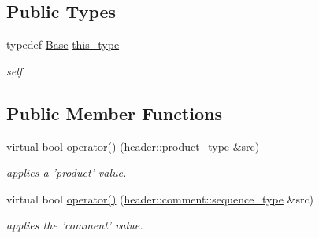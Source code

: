 \subsection*{Public Types}
\begin{DoxyCompactItemize}
\item 
\hypertarget{classhryky_1_1http_1_1header_1_1product__comment_1_1dispatcher_1_1_base_af6a63f75e57bd57e61476822945eb14e}{typedef \hyperlink{classhryky_1_1http_1_1header_1_1product__comment_1_1dispatcher_1_1_base}{Base} \hyperlink{classhryky_1_1http_1_1header_1_1product__comment_1_1dispatcher_1_1_base_af6a63f75e57bd57e61476822945eb14e}{this\-\_\-type}}\label{classhryky_1_1http_1_1header_1_1product__comment_1_1dispatcher_1_1_base_af6a63f75e57bd57e61476822945eb14e}

\begin{DoxyCompactList}\small\item\em self. \end{DoxyCompactList}\end{DoxyCompactItemize}
\subsection*{Public Member Functions}
\begin{DoxyCompactItemize}
\item 
\hypertarget{classhryky_1_1http_1_1header_1_1product__comment_1_1dispatcher_1_1_base_ab48ac4c4dc4bec82ba36d5d6df51f8ba}{virtual bool \hyperlink{classhryky_1_1http_1_1header_1_1product__comment_1_1dispatcher_1_1_base_ab48ac4c4dc4bec82ba36d5d6df51f8ba}{operator()} (\hyperlink{classhryky_1_1http_1_1header_1_1product_1_1_entity}{header\-::product\-\_\-type} \&src)}\label{classhryky_1_1http_1_1header_1_1product__comment_1_1dispatcher_1_1_base_ab48ac4c4dc4bec82ba36d5d6df51f8ba}

\begin{DoxyCompactList}\small\item\em applies a 'product' value. \end{DoxyCompactList}\item 
\hypertarget{classhryky_1_1http_1_1header_1_1product__comment_1_1dispatcher_1_1_base_a30d3e99d2f523cda6b31f4b6d95890f2}{virtual bool \hyperlink{classhryky_1_1http_1_1header_1_1product__comment_1_1dispatcher_1_1_base_a30d3e99d2f523cda6b31f4b6d95890f2}{operator()} (\hyperlink{classhryky_1_1http_1_1header_1_1comment_1_1_sequence}{header\-::comment\-::sequence\-\_\-type} \&src)}\label{classhryky_1_1http_1_1header_1_1product__comment_1_1dispatcher_1_1_base_a30d3e99d2f523cda6b31f4b6d95890f2}

\begin{DoxyCompactList}\small\item\em applies the 'comment' value. \end{DoxyCompactList}\end{DoxyCompactItemize}
